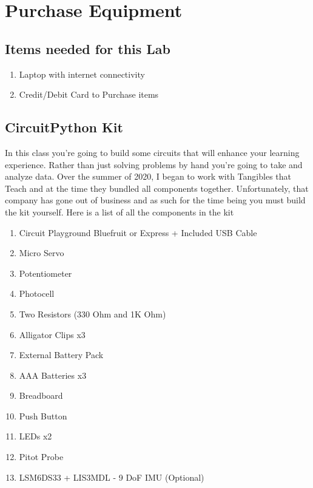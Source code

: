 \newpage

\section{Purchase Equipment}

\subsection{Items needed for this Lab}

\begin{enumerate}[itemsep=-5pt]
\item Laptop with internet connectivity
\item Credit/Debit Card to Purchase items
\end{enumerate}

\subsection{CircuitPython Kit}

In this class you’re going to build some circuits that will enhance
your learning experience. Rather than just solving problems by hand
you’re going to take and analyze data. Over the summer of 2020, I
began to work with Tangibles that Teach and at the time they bundled
all components together. Unfortunately, that company has gone out of
business and as such for the time being you must build the kit
yourself. Here is a list of all the components in the kit

\begin{enumerate}[itemsep=-5pt]
\item Circuit Playground Bluefruit or Express + Included USB Cable
\item Micro Servo
\item Potentiometer
\item Photocell
\item Two Resistors (330 Ohm and 1K Ohm)
\item Alligator Clips x3
\item External Battery Pack
\item AAA Batteries x3
\item Breadboard
\item Push Button 
\item LEDs x2
\item Pitot Probe
\item LSM6DS33 + LIS3MDL - 9 DoF IMU (Optional)
\end{enumerate}

